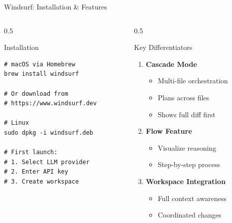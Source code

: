 \documentclass[aspectratio=169,11pt]{beamer}
\begin{document}
\begin{frame}[fragile]{Windsurf: Installation \& Features}
    \begin{columns}[T]
        \begin{column}{0.5\textwidth}
            \begin{block}{Installation}
                \begin{lstlisting}[style=bash]
# macOS via Homebrew
brew install windsurf

# Or download from
# https://www.windsurf.dev

# Linux
sudo dpkg -i windsurf.deb

# First launch:
# 1. Select LLM provider
# 2. Enter API key
# 3. Create workspace
                \end{lstlisting}
            \end{block}
        \end{column}
        \begin{column}{0.5\textwidth}
            \begin{block}{Key Differentiators}
                \begin{enumerate}
                    \item \textbf{Cascade Mode}
                    \begin{itemize}
                        \item Multi-file orchestration
                        \item Plans across files
                        \item Shows full diff first
                    \end{itemize}
                    \item \textbf{Flow Feature}
                    \begin{itemize}
                        \item Visualize reasoning
                        \item Step-by-step process
                    \end{itemize}
                    \item \textbf{Workspace Integration}
                    \begin{itemize}
                        \item Full context awareness
                        \item Coordinated changes
                    \end{itemize}
                \end{enumerate}
            \end{block}
        \end{column}
    \end{columns}


\end{frame}
\end{document}
